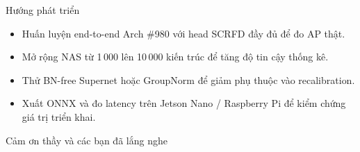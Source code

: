 \documentclass[aspectratio=169,11pt]{beamer}
\newif\ifhascites
\begin{document}
\begin{frame}{Hướng phát triển}
  \begin{itemize}
    \setlength{\itemsep}{6pt}
    \item Huấn luyện end-to-end Arch \#980 với head SCRFD đầy đủ để đo AP thật.
    \item Mở rộng NAS từ 1\,000 lên 10\,000 kiến trúc để tăng độ tin cậy thống kê.
    \item Thử BN-free Supernet hoặc GroupNorm để giảm phụ thuộc vào recalibration.
    \item Xuất ONNX và đo latency trên Jetson Nano / Raspberry Pi để kiểm chứng giá trị triển khai.
  \end{itemize}
\end{frame}

\ifhascites
\begin{frame}[allowframebreaks]{Tài liệu tham khảo}
  \tiny
  \printbibliography[heading=none]
\end{frame}
\fi

\begin{frame}
  \centering
  {\LARGE Cảm ơn thầy và các bạn đã lắng nghe}
\end{frame}
\end{document}
